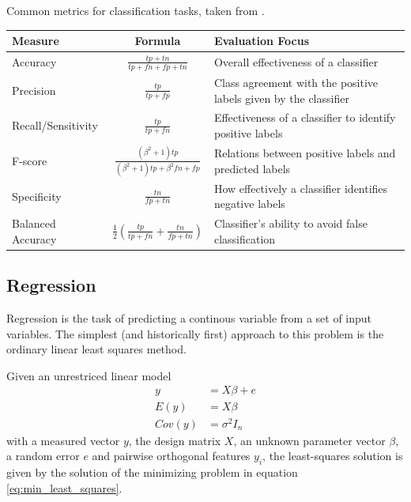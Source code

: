 \begin{center}
    \caption{
      Common metrics for classification tasks, taken from \cite{sokolova2009systematic}.}
    \begin{tabularx}{\textwidth}{l c X}
    Measure & Formula & Evaluation Focus \\ 
    \hline
    Accuracy & $\frac{tp+tn}{tp+fn+fp+tn}$ & Overall effectiveness of a classifier \\ 
    Precision & $\frac{tp}{tp+fp}$ & Class agreement with the positive labels given by the classifier \\
    Recall/Sensitivity & $\frac{tp}{tp+fn}$ & Effectiveness of a classifier to identify positive labels \\
    F-score & $\frac{(\beta^2+1)tp}{(\beta^2+1)tp+\beta^2fn+fp}$ & Relations between positive labels and predicted labels\\
    Specificity & $\frac{tn}{fp+tn}$ & How effectively a classifier identifies negative labels \\ 
    Balanced Accuracy & $\frac{1}{2}(\frac{tp}{tp+fn}+\frac{tn}{fp+tn})$ & Classifier’s ability to avoid false classification \\ 
    \end{tabularx}
\end{center}

\subsection{Regression}
Regression is the task of predicting a continous variable
from a set of input variables.
The simplest (and historically first) approach 
to this problem is the ordinary linear least squares method.

Given an unrestriced linear model
\begin{align}
	y &= X\beta + e \\
	E(y) &= X\beta \\
	Cov(y) &= \sigma^2 I_n
\end{align}
with a measured vector $y$, the design matrix $X$,
an unknown parameter vector $\beta$, a random error $e$ 
and pairwise orthogonal features $y_i$,
the least-squares solution is given by the solution of 
the minimizing problem in equation \ref{eq:min_least_squares}.

